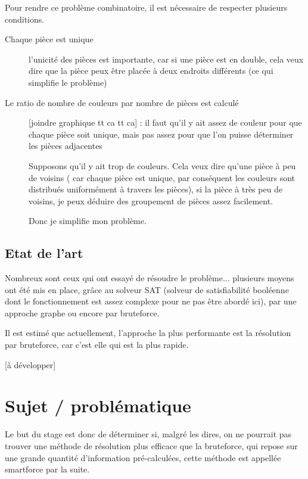 \documentclass{article}
\begin{document}
	Pour rendre ce problème combinatoire, il est nécessaire de respecter plusieurs conditions.
	
	\begin{description}
		\item[Chaque pièce est unique] l'unicité des pièces est importante, car si une pièce est en double, cela veux dire que la pièce peux être placée à deux endroits différents (ce qui simplifie le problème)
		\item[Le ratio de nombre de couleurs par nombre de pièces est calculé] [joindre graphique tt ca tt ca] : il faut qu'il y ait assez de couleur pour que chaque pièce soit unique, mais pas assez pour que l'on puisse déterminer les pièces adjacentes
		
		\begin{exmp}
			Supposons qu'il y ait trop de couleurs. Cela veux dire qu'une pièce à peu de voisins ( car chaque pièce est unique, par conséquent les couleurs sont distribués uniformément à travers les pièces), si la pièce à très peu de voisins, je peux déduire des groupement de pièces assez facilement.
			
			Donc je simplifie mon problème.
		\end{exmp}		
	\end{description}
	
	\subsection{Etat de l'art}
	
	Nombreux sont ceux qui ont essayé de résoudre le problème... plusieurs moyens ont été mis en place, grâce au solveur SAT (solveur de satisfiabilité booléenne dont le fonctionnement est assez complexe pour ne pas être abordé ici), par une approche graphe ou encore par bruteforce.
	
	Il est estimé que actuellement, l'approche la plus performante est la résolution par bruteforce, car c'est elle qui est la plus rapide.
	
	[à développer]
	
	\section{Sujet / problématique}
	
	Le but du stage est donc de déterminer si, malgré les dires, on ne pourrait pas trouver une méthode de résolution plus efficace que la bruteforce, qui repose sur une grande quantité d'information pré-calculées, cette méthode est appellée smartforce par la suite.
	
\end{document}
